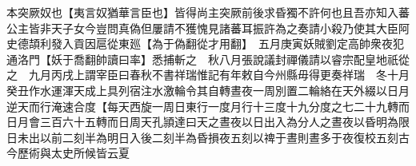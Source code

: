 本突厥奴也【夷言奴猶華言臣也】皆得尚主突厥前後求昏獨不許何也且吾亦知入蕃公主皆非天子女今豈問真偽但屢請不獲愧見諸蕃耳振許為之奏請小殺乃使其大臣阿史德頡利發入貢因扈從東廵【為于偽翻從才用翻】　五月庚寅妖賊劉定高帥衆夜犯通洛門【妖于喬翻帥讀曰率】悉捕斬之　秋八月張說議封禪儀請以睿宗配皇地祇從之　九月丙戌上謂宰臣曰春秋不書祥瑞惟記有年敕自今州縣毋得更奏祥瑞　冬十月癸丑作水運渾天成上具列宿注水激輪令其自轉晝夜一周別置二輪絡在天外綴以日月逆天而行淹速合度【每天西旋一周日東行一度月行十三度十九分度之七二十九轉而日月會三百六十五轉而日周天孔頴達曰天之晝夜以日出入為分人之晝夜以昏明為限日未出以前二刻半為明日入後二刻半為昏損夜五刻以禆于晝則晝多于夜復校五刻古今歷術與太史所候皆云夏